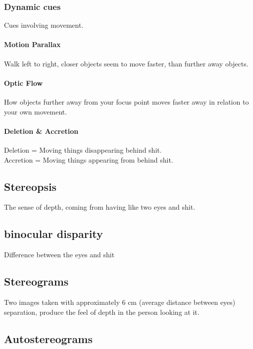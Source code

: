 		\subsubsection{Dynamic cues}
			Cues involving movement.
			\paragraph{Motion Parallax}
				Walk left to right, closer objects seem to move faster, than further away objects.
			\paragraph{Optic Flow}
				How objects further away from your focus point moves faster away in relation to your own movement.
			\paragraph{Deletion \& Accretion}
				Deletion = Moving things disappearing behind shit.\\
				Accretion = Moving things appearing from behind shit.
	
		\subsection{Stereopsis}
			The sense of depth, coming from having like two eyes and shit.
		\subsection{binocular disparity}
		Difference between the eyes and shit
		
		\subsection{Stereograms}
		Two images taken with approximately 6 cm (average distance between eyes) separation, produce the feel of depth in the person looking at it.
		
		\subsection{Autostereograms}